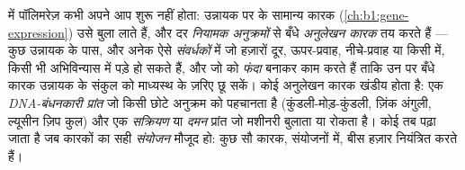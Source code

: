 \begin{definition}[अनुलेखन कारक, संवर्धक]\label{def:b1:expression-control:enhancer}
 में पॉलिमरेज़ कभी अपने आप शुरू नहीं होता: उन्नायक पर के
सामान्य कारक (\cref{ch:b1:gene-expression}) उसे बुला लाते हैं, और
दर \emph{नियामक अनुक्रमों} से बँधे \emph{अनुलेखन कारक} तय करते हैं
--- कुछ उन्नायक के पास, और अनेक ऐसे \emph{संवर्धकों} में जो हज़ारों
 दूर, ऊपर-प्रवाह, नीचे-प्रवाह या किसी  में, किसी भी
अभिविन्यास में पड़े हो सकते हैं, और जो  को \emph{फंदा} बनाकर काम करते
हैं ताकि उन पर बँधे कारक उन्नायक के संकुल को माध्यस्थ  के ज़रिए
छू सकें। कोई अनुलेखन कारक खंडीय होता है: एक \emph{DNA-बंधनकारी प्रांत}
जो किसी छोटे अनुक्रम को पहचानता है (कुंडली-मोड़-कुंडली, ज़िंक अंगुली,
ल्यूसीन ज़िप कुल) और एक \emph{सक्रियण} या \emph{दमन} प्रांत जो मशीनरी
बुलाता या रोकता है। कोई  तब पढ़ा जाता है जब कारकों का सही
\emph{संयोजन} मौजूद हो: कुछ सौ कारक, संयोजनों में, बीस हज़ार 
नियंत्रित करते हैं।
\end{definition}

